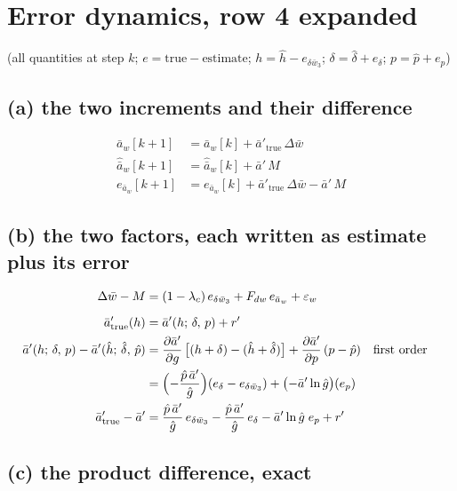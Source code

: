 \documentclass[11pt,a4paper,fontset=none]{ctexart}
\newcommand{\ba}{\bar{a}}
\newcommand{\bw}{\bar{w}}
\newcommand{\dW}{\Delta\bw}
\newcommand{\ap}{\ba'}
\newcommand{\ah}{\hat{\ba}_w}
\newcommand{\hh}{\hat{h}}
\newcommand{\ph}{\hat{p}}
\newcommand{\dl}{\delta}
\newcommand{\dlh}{\hat{\delta}}
\newcommand{\gs}{g}
\newcommand{\gh}{\hat{g}}
\begin{document}
\newpage
\section{Error dynamics, row 4 expanded}

(all quantities at step $k$; $e = \text{true} - \text{estimate}$; $h = \hh - e_{\delta\bw_3}$; $\dl = \dlh + e_{\dl}$; $p = \ph + e_p$)

\subsection*{(a) the two increments and their difference}

\begin{align*}
\ba_w[k+1]                    &= \ba_w[k] + \ap_{\mathrm{true}}\,\dW \\
\ah[k+1]                      &= \ah[k]   + \ap\,M \\
e_{\ba_w}[k+1]                &= e_{\ba_w}[k] + \ap_{\mathrm{true}}\,\dW - \ap\,M
\end{align*}

\subsection*{(b) the two factors, each written as estimate plus its error}

\begin{align*}
\dW - M                       &= (1-\lambda_c)\,e_{\delta\bw_3} + F_{dw}\,e_{\ba_w} + \varepsilon_w \\[6pt]
\ap_{\mathrm{true}}(h)        &= \ap(h;\,\dl,\,p) + r' \\
\ap(h;\,\dl,\,p) - \ap(\hh;\,\dlh,\,\ph)
                              &= \frac{\partial\ap}{\partial\gs}\,\bigl[(h + \dl) - (\hh + \dlh)\bigr] + \frac{\partial\ap}{\partial p}\,(p - \ph)
                                 && \text{first order} \\
                              &= \Bigl(-\frac{\ph\,\ap}{\gh}\Bigr)(e_{\dl} - e_{\delta\bw_3}) + \bigl(-\ap\ln\gh\bigr)(e_p) \\
\ap_{\mathrm{true}} - \ap     &= \frac{\ph\,\ap}{\gh}\,e_{\delta\bw_3} - \frac{\ph\,\ap}{\gh}\,e_{\dl} - \ap\ln\gh\;e_p + r'
\end{align*}

\subsection*{(c) the product difference, exact}
\end{document}
